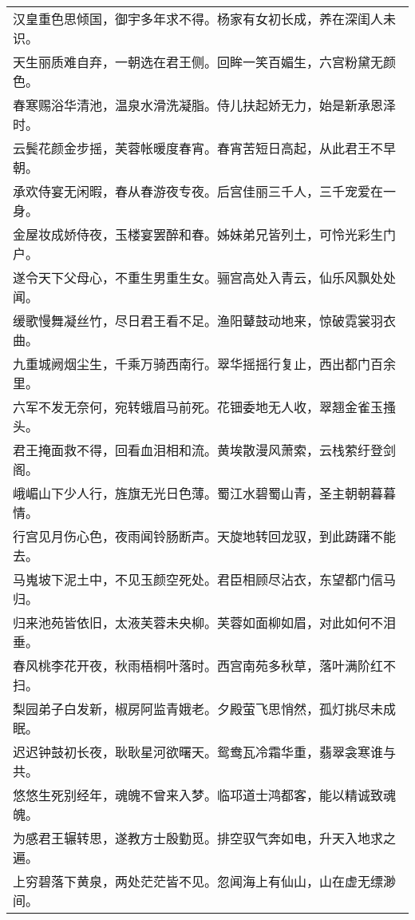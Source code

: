 \nopagebreak%
\nopagebreak%
\noindent\begin{minipage}{\linewidth}
  \vskip-3pt\begin{table}[H]
    \centering
    \begin{tabular}{@{}l@{}}
汉皇重色思倾国，御宇多年求不得。杨家有女初长成，养在深闺人未识。\\
天生丽质难自弃，一朝选在君王侧。回眸一笑百媚生，六宫粉黛无颜色。\\
春寒赐浴华清池，温泉水滑洗凝脂。侍儿扶起娇无力，始是新承恩泽时。\\
云鬓花颜金步摇，芙蓉帐暖度春宵。春宵苦短日高起，从此君王不早朝。\\
承欢侍宴无闲暇，春从春游夜专夜。后宫佳丽三千人，三千宠爱在一身。\\
金屋妆成娇侍夜，玉楼宴罢醉和春。姊妹弟兄皆列土，可怜光彩生门户。\\
遂令天下父母心，不重生男重生女。骊宫高处入青云，仙乐风飘处处闻。\\
缓歌慢舞凝丝竹，尽日君王看不足。渔阳鼙鼓动地来，惊破霓裳羽衣曲。\\
九重城阙烟尘生，千乘万骑西南行。翠华摇摇行复止，西出都门百余里。\\
六军不发无奈何，宛转蛾眉马前死。花钿委地无人收，翠翘金雀玉搔头。\\
君王掩面救不得，回看血泪相和流。黄埃散漫风萧索，云栈萦纡登剑阁。\\
峨嵋山下少人行，旌旗无光日色薄。蜀江水碧蜀山青，圣主朝朝暮暮情。\\
行宫见月伤心色，夜雨闻铃肠断声。天旋地转回龙驭，到此踌躇不能去。\\
马嵬坡下泥土中，不见玉颜空死处。君臣相顾尽沾衣，东望都门信马归。\\
归来池苑皆依旧，太液芙蓉未央柳。芙蓉如面柳如眉，对此如何不泪垂。\\
春风桃李花开夜，秋雨梧桐叶落时。西宫南苑多秋草，落叶满阶红不扫。\\
梨园弟子白发新，椒房阿监青娥老。夕殿萤飞思悄然，孤灯挑尽未成眠。\\
迟迟钟鼓初长夜，耿耿星河欲曙天。鸳鸯瓦冷霜华重，翡翠衾寒谁与共。\\
悠悠生死别经年，魂魄不曾来入梦。临邛道士鸿都客，能以精诚致魂魄。\\
为感君王辗转思，遂教方士殷勤觅。排空驭气奔如电，升天入地求之遍。\\
上穷碧落下黄泉，两处茫茫皆不见。忽闻海上有仙山，山在虚无缥渺间。\\

\end{tabular}
\end{table}
\end{minipage}
